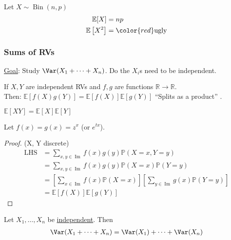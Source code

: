 \begin{example} \label{exm:var-bin}
    Let $X \sim \operatorname{Bin}(n, p)$
    \begin{align*}
        \mathbb{E}[X] &= np  \\
        \mathbb{E}\left[X^2\right] &= \color{red} \text{ugly}
    \end{align*} 
\end{example} 

\subsubsection{Sums of RVs}

\color{blue} \underline{Goal}: Study $\Var(X_1 + \dots + X_n)$. Do the $X_i$s need to be independent. \color{black}

\begin{proposition}
    If $X, Y$ are \color{red} independent \color{black} RVs and $f, g$ are functions $\mathbb{R} \to \mathbb{R}$. \\
    Then: $\mathbb{E}[f(X) g(Y)] = \mathbb{E}[f(X)] \mathbb{E}[g(Y)]$ \color{blue} ``Splits as a product'' \color{black}.
\end{proposition} 

\begin{example}
    $\mathbb{E}[XY] = \mathbb{E}[X] \mathbb{E}[Y]$
\end{example} 

\begin{example}
    Let $f(x) = g(x) = z^x$ (or $e^{tx}$).
\end{example} 

\begin{proof}
    \color{blue} (X, Y discrete) \color{black}
    \begin{align*}
        \text{LHS} &= \sum_{x, y \in \operatorname{Im}} f(x) g(y) \mathbb{P}(X = x, Y = y) \\
        &= \sum_{x, y \in \operatorname{Im}} f(x) g(y) \mathbb{P}(X = x) \mathbb{P}(Y = y) \\
        &= \left[\sum_{x \in \operatorname{Im}} f(x) \mathbb{P}(X = x) \right] \left[\sum_{y \in \operatorname{Im}} g(x) \mathbb{P}(Y = y) \right] \\
        &= \mathbb{E}[f(X)] \mathbb{E}[g(Y)]
    \end{align*} 
\end{proof} 

\begin{proposition}
    Let $X_1, \dots, X_n$ be \underline{independent}.
    Then
    \begin{align*}
        \Var(X_1 + \dots + X_n) = \Var(X_1) + \dots + \Var(X_n)
    \end{align*} 
\end{proposition} 

